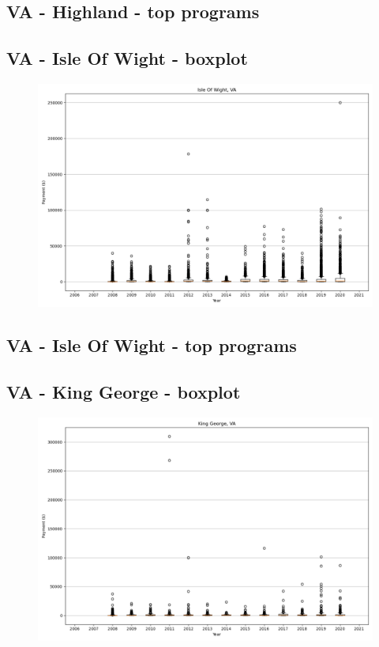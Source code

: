 \subsection*{VA - Highland - top programs}

\newpage
\subsection*{VA - Isle Of Wight - boxplot}
\begin{figure}[h]
\centering
\includegraphics[width=7in]{../output/boxplots/counties/Isle Of Wight-VA_boxplot.png}
\end{figure}


\subsection*{VA - Isle Of Wight - top programs}

\newpage
\subsection*{VA - King George - boxplot}
\begin{figure}[h]
\centering
\includegraphics[width=7in]{../output/boxplots/counties/King George-VA_boxplot.png}
\end{figure}


